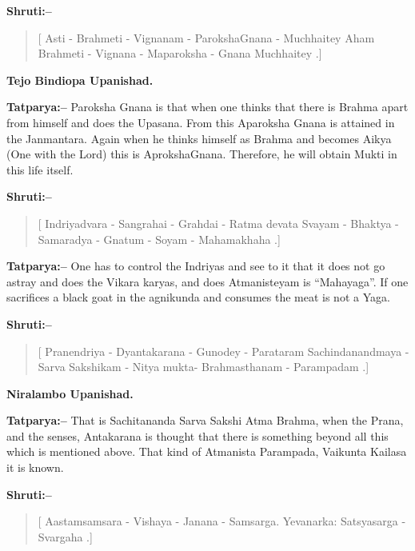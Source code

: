 \textbf{Shruti:–}

\begin{verse}
[ Asti - Brahmeti - Vignanam - ParokshaGnana - Muchhaitey  Aham Brahmeti - Vignana - Maparoksha - Gnana Muchhaitey .]
\end{verse}

\begin{flushright}
\textbf{Tejo Bindiopa Upanishad.}
\end{flushright}

\textbf{Tatparya:–} Paroksha Gnana is that when one thinks that there is Brahma apart from himself and does the Upasana. From this Aparoksha Gnana is attained in the Janmantara. Again when he thinks himself as Brahma and becomes Aikya (One with the Lord) this is AprokshaGnana. Therefore, he will obtain Mukti in this life itself.

\textbf{Shruti:–}

\begin{verse}
[ Indriyadvara - Sangrahai - Grahdai - Ratma devata  Svayam - Bhaktya - Samaradya - Gnatum - Soyam - Mahamakhaha .]
\end{verse}

\textbf{Tatparya:–} One has to control the Indriyas and see to it that it does not go astray and does the Vikara karyas, and does Atmanisteyam is “Mahayaga”. If one sacrifices a black goat in the agnikunda and consumes the meat is not a Yaga.

\newpage

\textbf{Shruti:–}

\begin{verse}
[ Pranendriya - Dyantakarana - Gunodey - Parataram  Sachindanandmaya - Sarva Sakshikam - Nitya mukta- Brahmasthanam - Parampadam .]
\end{verse}

\begin{flushright}
\textbf{Niralambo Upanishad.}
\end{flushright}

\textbf{Tatparya:–} That is Sachitananda Sarva Sakshi Atma Brahma, when the Prana, and the senses, Antakarana is thought that there is something beyond all this which is mentioned above. That kind of Atmanista Parampada, Vaikunta Kailasa it is known.

\textbf{Shruti:–}

\begin{verse}
[ Aastamsamsara - Vishaya - Janana - Samsarga. Yevanarka:  Satsyasarga - Svargaha .]
\end{verse}

